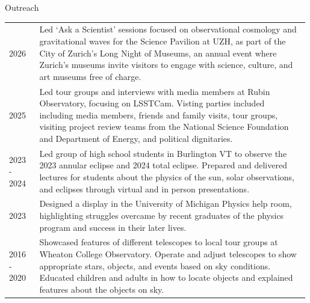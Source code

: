 \begin{rSection}{Outreach}
\setlength{\extrarowheight}{3pt}
\begin{longtable}{p{0.1\linewidth}p{0.89\linewidth}}
2026 & Led `Ask a Scientist' sessions focused on observational cosmology and gravitational waves for the Science Pavilion at UZH, as part of the City of Zurich's Long Night of Museums, an annual event where Zurich's museums invite visitors to engage with science, culture, and art museums free of charge.\\
2025 & Led tour groups and interviews with media members at Rubin Observatory, focusing on \ac{LSSTCam}. Visting parties included including media members, friends and family visits, tour groups, visiting project review teams from the National Science Foundation and Department of Energy, and political dignitaries.\\
2023 - 2024 & Led group of high school students in Burlington VT to observe the 2023 annular eclipse and 2024 total eclipse. Prepared and delivered lectures for students about the physics of the sun, solar observations, and eclipses through virtual and in person presentations.\\
2023 & Designed a display in the University of Michigan Physics help room, highlighting struggles overcame by recent graduates of the physics program and success in their later lives.\\
2016 - 2020 & Showcased features of different telescopes to local tour groups at Wheaton College Observatory. Operate and adjust telescopes to show appropriate stars, objects, and events based on sky conditions. Educated children and adults in how to locate objects and explained features about the objects on sky.
    \end{longtable}
\end{rSection}
